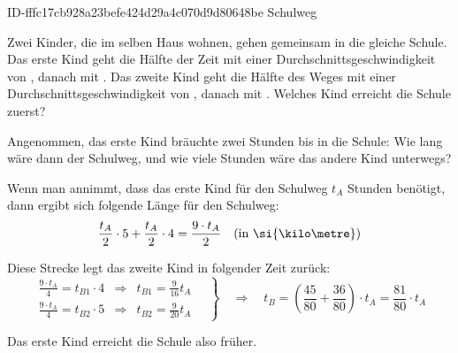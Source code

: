 \begin{exercise}
      {ID-fffc17cb928a23befe424d29a4c070d9d80648be}
      {Schulweg}
  \ifproblem\problem\par
    Zwei Kinder, die im selben Haus wohnen, gehen gemeinsam in die gleiche
    Schule. Das erste Kind geht die Hälfte der Zeit mit einer
    Durchschnittsgeschwindigkeit von , danach mit . Das
    zweite Kind geht die Hälfte des Weges mit einer Durchschnittsgeschwindigkeit
    von , danach mit . Welches Kind erreicht die Schule
    zuerst?
  \fi
  \ifoutline\outline\par
    Angenommen, das erste Kind bräuchte zwei Stunden bis in die Schule:
    Wie lang wäre dann der Schulweg, und wie viele Stunden wäre das andere Kind unterwegs?
  \fi
  \ifoutcome\outcome\par
    \begin{center}
    \end{center}
    Wenn man annimmt, dass das erste Kind für den Schulweg $t_{A}$ Stunden benötigt,
    dann ergibt sich folgende Länge für den Schulweg:
    \begin{equation*}
      \frac{t_{A}}{2}\cdot5+\frac{t_{A}}{2}\cdot4
      =
      \frac{9\cdot t_{A}}{2}
      \quad\text{(in \si{\kilo\metre})}
    \end{equation*}

    Diese Strecke legt das zweite Kind in folgender Zeit zurück:
    \begin{equation*}
      \left.
      \begin{array}{lcl}
        \displaystyle\frac{9\cdot t_{A}}{4}=t_{B1}\cdot4 & \Rightarrow & t_{B1}=\displaystyle\frac{9}{16}t_{A}\\[3ex]
        \displaystyle\frac{9\cdot t_{A}}{4}=t_{B2}\cdot5 & \Rightarrow & t_{B2}=\displaystyle\frac{9}{20}t_{A}
      \end{array}
      \quad\right\}
      \quad\Rightarrow\quad
      t_{B}=\left(\frac{45}{80}+\frac{36}{80}\right)\cdot t_{A}=\frac{81}{80}\cdot t_{A}
    \end{equation*}

    Das erste Kind erreicht die Schule also früher.
  \fi
\end{exercise}

